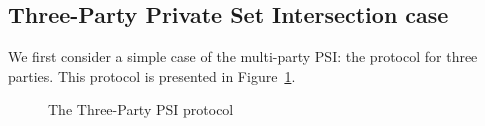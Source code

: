 \subsection{Three-Party Private Set Intersection case}
\label{sect:3psi-construction}
We first consider a simple case of the multi-party PSI: the protocol for three parties. This protocol is presented in Figure~\ref{fig:3psi}. 

\begin{figure}[h]\centering
{}
\caption{The Three-Party PSI protocol}
\label{fig:3psi}
\end{figure}